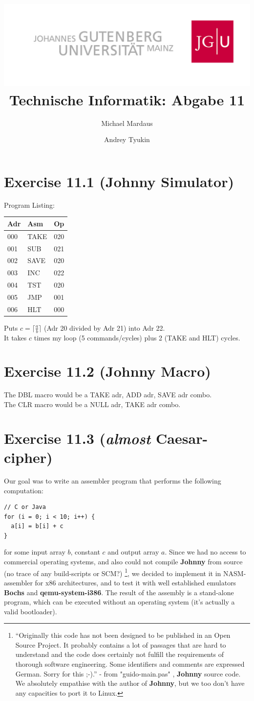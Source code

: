 \documentclass[10pt,a4paper]{scrartcl}
\author{Michael Mardaus \and Andrey Tyukin}
\title{\includegraphics[scale=0.2]{../logo_schriftzug}\\
Technische Informatik: Abgabe 11}
\newcommand{\subExercise}[1]{\vspace{0.5em} \noindent{\bf #1)}}
\begin{document}
\maketitle

\section*{Exercise 11.1 (Johnny Simulator)}
\subExercise{a}
Program Listing:\\
\begin{tabular}{l|l|l}
Adr & Asm  & Op\\\hline
000 &  TAKE & 020\\
001 &  SUB  & 021\\
002 &  SAVE & 020\\
003 &  INC  & 022\\
004 &  TST  & 020\\
005 &  JMP  & 001\\
006 &  HLT  & 000\\
\end{tabular}

Puts $c = \lceil \frac{a}{b} \rceil$ (Adr 20 divided by Adr 21) into Adr 22.\\

\subExercise{b}
It takes $c$ times my loop (5 commands/cycles) plus 2 (TAKE and HLT) cycles.

\section*{Exercise 11.2 (Johnny Macro)}
The DBL macro would be a TAKE adr, ADD adr, SAVE adr combo.\\
The CLR macro would be a NULL adr, TAKE adr combo.

\section*{Exercise 11.3 (\emph{almost} Caesar-cipher)}
Our goal was to write an assembler program that performs the 
following computation:
\begin{verbatim}
// C or Java
for (i = 0; i < 10; i++) {
  a[i] = b[i] + c
}
\end{verbatim}
for some input array $b$, constant $c$ and output array $a$. 
Since we had no access to commercial operating systems, 
and also could not compile \textbf{Johnny} from source (no trace of any build-scripts or SCM?) \footnote{``Originally this code has not been designed to be published in an Open Source
Project. It probably contains a lot of passages that are hard to understand and
the code does certainly not fulfill the requirements of thorough
software engineering.
Some identifiers and comments are expressed German. Sorry for this ;-).'' - from "guido-main.pas" , \textbf{Johnny} source code. We absolutely empathise with the author of \textbf{Johnny}, but we too don't have any capacities to port it to Linux.}, we decided to implement it in NASM-assembler for x86 architectures, and to test it with well established emulators \textbf{Bochs} and \textbf{qemu-system-i386}. The result of the assembly is a stand-alone program, which can be executed without an operating system (it's actually a valid bootloader).
\end{document}
